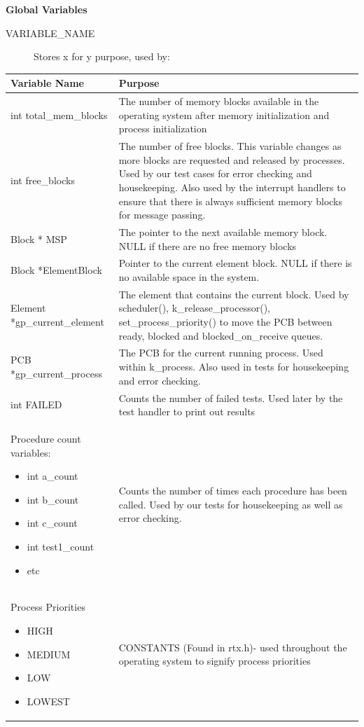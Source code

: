 \documentclass[11pt, oneside]{article}
\begin{document}
\clearpage
{\bf Global Variables}
\begin{description}
\item [VARIABLE\_NAME] Stores x for y purpose, used by:
\end{description}
\begin{longtable}{|L{5cm}|L{10.5cm}|} \hline
\textbf{Variable Name} & \textbf{Purpose} \\ \hline
int total\_mem\_blocks & The number of memory blocks available in the operating system after memory initialization and process initialization \\ \hline
int free\_blocks & The number of free blocks. This variable changes as more blocks are requested and released by processes. Used by our test cases for error checking and housekeeping. Also used by the interrupt handlers to ensure that there is always sufficient memory blocks for message passing. \\ \hline
Block * MSP & The pointer to the next available memory block. NULL if there are no free memory blocks \\ \hline
Block *ElementBlock & Pointer to the current element block. NULL if there is no available space in the system. \\ \hline
Element *gp\_current\_element & The element that contains the current block. Used by scheduler(), k\_release\_processor(), set\_process\_priority() to move the PCB between ready, blocked and blocked\_on\_receive queues. \\ \hline
PCB *gp\_current\_process & The PCB for the current running process. Used within k\_process. Also used in tests for housekeeping and error checking. \\ \hline
int FAILED & Counts the number of failed tests. Used later by the test handler to print out results \\ \hline
Procedure count variables:
\begin{itemize}
\item int a\_count
\item int b\_count
\item int c\_count
\item int test1\_count
\item etc
\end{itemize}
& Counts the number of times each procedure has been called. Used by our tests for housekeeping as well as error checking. \\ \hline

Process Priorities
\begin{itemize}
\item HIGH
\item MEDIUM
\item LOW
\item LOWEST
\end{itemize}
& CONSTANTS (Found in rtx.h)- used throughout the operating system to signify process priorities\\ \hline

\end{longtable}
\end{document}
